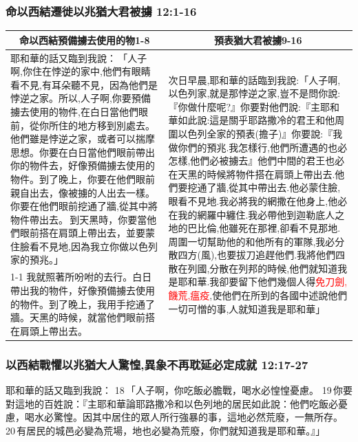 \subsubsection{命以西結遷徙以兆猶大君被擄 12:1-16}
\begin{table}[H]
\centering
\begin{tabular}{p{8.25cm}|p{9cm}}\hline\hline
\multicolumn{1}{c|}{命以西結預備擄去使用的物1-8}&\multicolumn{1}{c}{預表猶大君被擄9-16}\\\hline
耶和華的話又臨到我說： 「人子啊,你住在悖逆的家中,他們有眼睛看不見,有耳朵聽不見，因為他們是悖逆之家。所以,人子啊,你要預備擄去使用的物件,在白日當他們眼前，從你所住的地方移到別處去。他們雖是悖逆之家，或者可以揣摩思想。你要在白日當他們眼前帶出你的物件去，好像預備擄去使用的物件。到了晚上，你要在他們眼前親自出去，像被擄的人出去一樣。你要在他們眼前挖通了牆,從其中將物件帶出去。 到天黑時，你要當他們眼前搭在肩頭上帶出去，並要蒙住臉看不見地,因為我立你做以色列家的預兆。」
&\multirow{2}{9.3cm}{次日早晨,耶和華的話臨到我說:「人子啊,以色列家,就是那悖逆之家,豈不是問你說:『你做什麼呢?』你要對他們說:『主耶和華如此說:這是關乎耶路撒冷的君王和他周圍以色列全家的預表(擔子)』你要說:『我做你們的預兆.我怎樣行,他們所遭遇的也必怎樣,他們必被擄去』他們中間的君王也必在天黑的時候將物件搭在肩頭上帶出去.他們要挖通了牆,從其中帶出去.他必蒙住臉,眼看不見地.我必將我的網撒在他身上,他必在我的網羅中纏住.我必帶他到迦勒底人之地的巴比倫,他雖死在那裡,卻看不見那地.周圍一切幫助他的和他所有的軍隊,我必分散四方(風),也要拔刀追趕他們.我將他們四散在列國,分散在列邦的時候,他們就知道我是耶和華.我卻要留下他們幾個人得\textcolor{red}{免刀劍,饑荒,瘟疫},使他們在所到的各國中述說他們一切可憎的事,人就知道我是耶和華」}\\\cline{1-1}
我就照著所吩咐的去行。白日帶出我的物件，好像預備擄去使用的物件。到了晚上，我用手挖通了牆。天黑的時候，就當他們眼前搭在肩頭上帶出去。&\\\hline
\end{tabular}
\end{table}



\subsubsection{以西結戰懼以兆猶大人驚惶,異象不再耽延必定成就 12:17-27}
耶和華的話又臨到我說： 18 「人子啊，你吃飯必膽戰，喝水必惶惶憂慮。 19 你要對這地的百姓說：『主耶和華論耶路撒冷和以色列地的居民如此說：他們吃飯必憂慮，喝水必驚惶。因其中居住的眾人所行強暴的事，這地必然荒廢，一無所存。 20 有居民的城邑必變為荒場，地也必變為荒廢，你們就知道我是耶和華。』」

